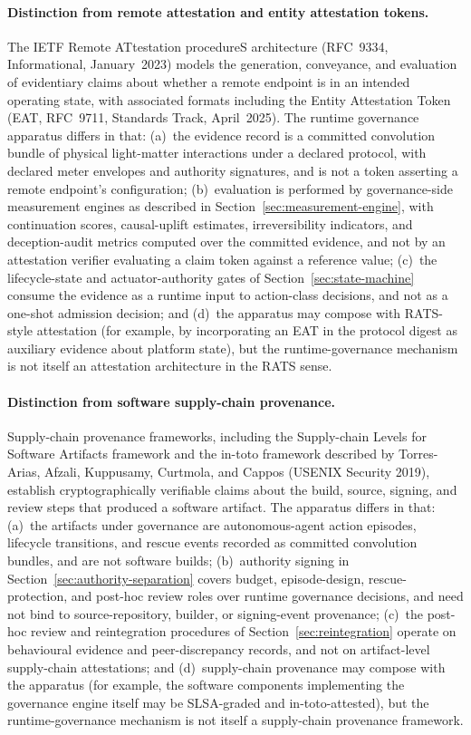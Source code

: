 \documentclass[a4paper,12pt]{article}
\newcommand{\cb}{convolution bundle\xspace}
\newcommand{\cbs}{convolution bundles\xspace}
\begin{document}
\paragraph{Distinction from remote attestation and entity
attestation tokens.}
The IETF Remote ATtestation procedureS architecture (RFC~9334,
Informational, January~2023) models the generation, conveyance,
and evaluation of evidentiary claims about whether a remote
endpoint is in an intended operating state, with associated
formats including the Entity Attestation Token (EAT, RFC~9711,
Standards Track, April~2025). The runtime governance apparatus
differs in that: (a)~the evidence record is a committed
\cb of physical light-matter interactions under a
declared protocol, with declared meter envelopes and authority
signatures, and is not a token asserting a remote endpoint's
configuration; (b)~evaluation is performed by governance-side
measurement engines as described in
Section~\ref{sec:measurement-engine}, with continuation scores,
causal-uplift estimates, irreversibility indicators, and
deception-audit metrics computed over the committed evidence,
and not by an attestation verifier evaluating a claim token
against a reference value; (c)~the lifecycle-state and
actuator-authority gates of Section~\ref{sec:state-machine}
consume the evidence as a runtime input to action-class decisions,
and not as a one-shot admission decision; and (d)~the apparatus
may compose with RATS-style attestation (for example, by
incorporating an EAT in the protocol digest as auxiliary
evidence about platform state), but the runtime-governance
mechanism is not itself an attestation architecture in the RATS
sense.

\paragraph{Distinction from software supply-chain provenance.}
Supply-chain provenance frameworks, including the Supply-chain
Levels for Software Artifacts framework and the in-toto framework
described by Torres-Arias, Afzali, Kuppusamy, Curtmola, and Cappos
(USENIX Security 2019), establish cryptographically verifiable
claims about the build, source, signing, and review steps that
produced a software artifact. The apparatus differs in that:
(a)~the artifacts under governance are autonomous-agent action
episodes, lifecycle transitions, and rescue events recorded as
committed \cbs, and are not software builds;
(b)~authority signing in Section~\ref{sec:authority-separation}
covers budget, episode-design, rescue-protection, and post-hoc
review roles over runtime governance decisions, and need not bind
to source-repository, builder, or signing-event provenance;
(c)~the post-hoc review and reintegration procedures of
Section~\ref{sec:reintegration} operate on behavioural evidence
and peer-discrepancy records, and not on artifact-level
supply-chain attestations; and (d)~supply-chain provenance may
compose with the apparatus (for example, the software components
implementing the governance engine itself may be SLSA-graded and
in-toto-attested), but the runtime-governance mechanism is not
itself a supply-chain provenance framework.
\end{document}
